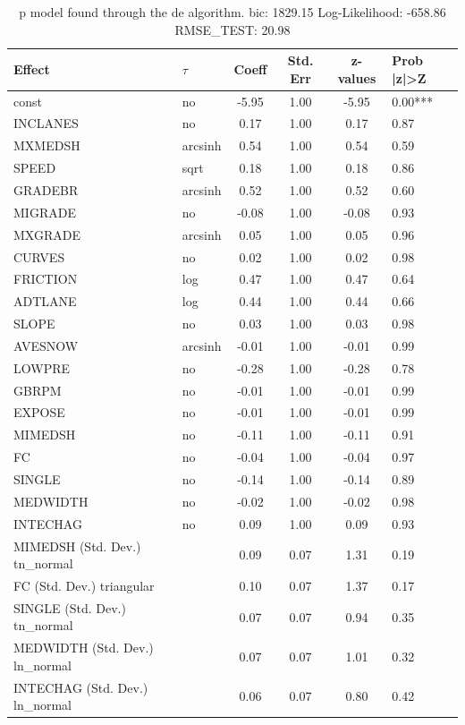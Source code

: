 \begin{table}
	\caption{p model found through the de algorithm. bic: 1829.15 Log-Likelihood: -658.86 RMSE_TEST: 20.98}
	\begin{center}
		\begin{tabular}{|l|l|c|c|c|l|}
			\hline
			Effect & $\tau$ & Coeff & Std. Err & z-values & Prob |z|>Z \\
			\hline
			const & no & -5.95 & 1.00 & -5.95 & 0.00*** \\
			\hline
			INCLANES & no & 0.17 & 1.00 & 0.17 & 0.87 \\
			\hline
			MXMEDSH & arcsinh & 0.54 & 1.00 & 0.54 & 0.59 \\
			\hline
			SPEED & sqrt & 0.18 & 1.00 & 0.18 & 0.86 \\
			\hline
			GRADEBR & arcsinh & 0.52 & 1.00 & 0.52 & 0.60 \\
			\hline
			MIGRADE & no & -0.08 & 1.00 & -0.08 & 0.93 \\
			\hline
			MXGRADE & arcsinh & 0.05 & 1.00 & 0.05 & 0.96 \\
			\hline
			CURVES & no & 0.02 & 1.00 & 0.02 & 0.98 \\
			\hline
			FRICTION & log & 0.47 & 1.00 & 0.47 & 0.64 \\
			\hline
			ADTLANE & log & 0.44 & 1.00 & 0.44 & 0.66 \\
			\hline
			SLOPE & no & 0.03 & 1.00 & 0.03 & 0.98 \\
			\hline
			AVESNOW & arcsinh & -0.01 & 1.00 & -0.01 & 0.99 \\
			\hline
			LOWPRE & no & -0.28 & 1.00 & -0.28 & 0.78 \\
			\hline
			GBRPM & no & -0.01 & 1.00 & -0.01 & 0.99 \\
			\hline
			EXPOSE & no & -0.01 & 1.00 & -0.01 & 0.99 \\
			\hline
			MIMEDSH & no & -0.11 & 1.00 & -0.11 & 0.91 \\
			\hline
			FC & no & -0.04 & 1.00 & -0.04 & 0.97 \\
			\hline
			SINGLE & no & -0.14 & 1.00 & -0.14 & 0.89 \\
			\hline
			MEDWIDTH & no & -0.02 & 1.00 & -0.02 & 0.98 \\
			\hline
			INTECHAG & no & 0.09 & 1.00 & 0.09 & 0.93 \\
			\hline
			MIMEDSH (Std. Dev.) tn_normal &  & 0.09 & 0.07 & 1.31 & 0.19 \\
			\hline
			FC (Std. Dev.) triangular &  & 0.10 & 0.07 & 1.37 & 0.17 \\
			\hline
			SINGLE (Std. Dev.) tn_normal &  & 0.07 & 0.07 & 0.94 & 0.35 \\
			\hline
			MEDWIDTH (Std. Dev.) ln_normal &  & 0.07 & 0.07 & 1.01 & 0.32 \\
			\hline
			INTECHAG (Std. Dev.) ln_normal &  & 0.06 & 0.07 & 0.80 & 0.42 \\
			\hline
		\end{tabular}
	\end{center}
\end{table}